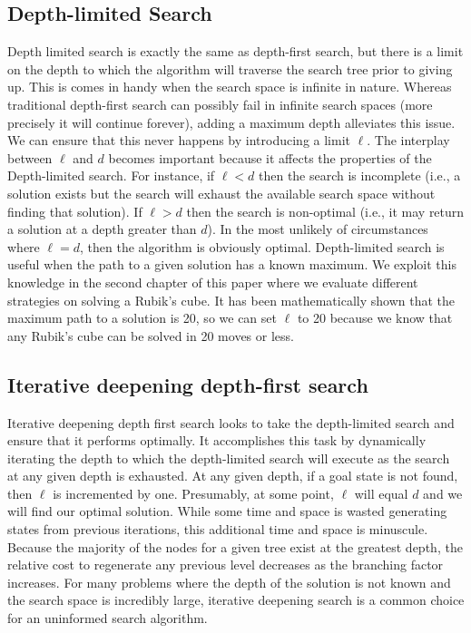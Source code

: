 \documentclass[a4paper,11pt]{report}
\begin{document}
\subsection{Depth-limited Search}
Depth limited search is exactly the same as depth-first search, but there is a
limit on the depth to which the algorithm will traverse the search tree prior
to giving up.  This is comes in handy when the search space is infinite in
nature.  Whereas traditional depth-first search can possibly fail in infinite
search spaces (more precisely it will continue forever), adding a maximum depth
alleviates this issue.\cite{norvig} We can ensure that this never happens by
introducing a limit $\ell$.  The interplay between $\ell$ and $d$ becomes
important because it affects the properties of the Depth-limited search.  For
instance, if $\ell < d$ then the search is incomplete (i.e., a solution exists
but the search will exhaust the available search space without finding that
solution). If $\ell > d$ then the search is non-optimal (i.e., it may return a
solution at a depth greater than $d$).\cite{norvig}  In the most unlikely of
circumstances where $\ell = d$, then the algorithm is obviously optimal.
Depth-limited search is useful when the path to a given solution has a known
maximum.  We exploit this knowledge in the second chapter of this paper where
we evaluate different strategies on solving a Rubik's cube.  It has been
mathematically shown that the maximum path to a solution is 20, so we can set
$\ell$ to 20 because we know that any Rubik's cube can be solved in 20 moves or
less.\cite{god20}

\subsection{Iterative deepening depth-first search}
Iterative deepening depth first search looks to take the depth-limited search
and ensure that it performs optimally. It accomplishes this task by dynamically
iterating the depth to which the depth-limited search will execute as the
search at any given depth is exhausted. At any given depth, if a goal state
is not found, then $\ell$ is incremented by one.  Presumably, at some point,
$\ell$ will equal $d$ and we will find our optimal solution.\cite{norvig} While
some time and space is wasted generating states from previous iterations, this
additional time and space is minuscule.  Because the majority of the nodes for
a given tree exist at the greatest depth, the relative cost to regenerate any
previous level decreases as the branching factor increases.\cite{norvig} For
many problems where the depth of the solution is not known and the search space
is incredibly large, iterative deepening search is a common choice for an
uninformed search algorithm.\cite{norvig}
\end{document}
